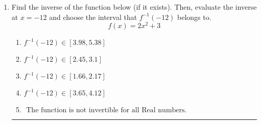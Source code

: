 \documentclass[14pt]{extbook}
\newcommand{\litem}[1]{\item#1\hspace*{-1cm}\rule{\textwidth}{0.4pt}}
\begin{document}
\begin{enumerate}
{\begin{enumerate}[label=\Alph*.]
\end{enumerate} }
\litem{
Find the inverse of the function below (if it exists). Then, evaluate the inverse at $x = -12$ and choose the interval that $f^{-1}(-12)$ belongs to.\[ f(x) = 2 x^2 + 3 \]\begin{enumerate}[label=\Alph*.]
\item \( f^{-1}(-12) \in [3.98, 5.38] \)
\item \( f^{-1}(-12) \in [2.45, 3.1] \)
\item \( f^{-1}(-12) \in [1.66, 2.17] \)
\item \( f^{-1}(-12) \in [3.65, 4.12] \)
\item \( \text{ The function is not invertible for all Real numbers. } \)

\end{enumerate} }
\end{enumerate}
\end{document}
